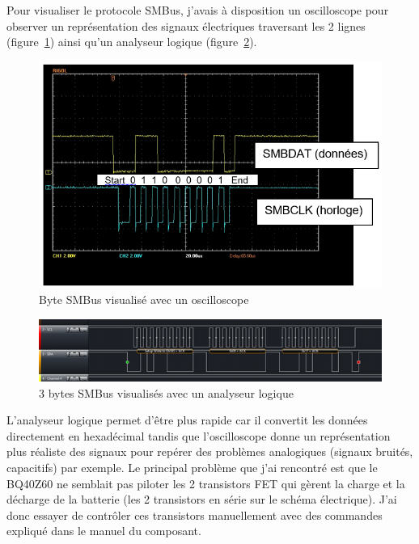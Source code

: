 \documentclass[a4paper, 11pt]{report}
\begin{document}
Pour visualiser le protocole SMBus, j’avais à disposition un oscilloscope pour observer un représentation des signaux électriques traversant les 2 lignes (figure~\ref{fig:SMBus_oscilloscope}) ainsi qu’un analyseur logique (figure~\ref{fig:SMBus_logic_analyser}).

\begin{figure}[!h]
\begin{center}
\includegraphics[scale=0.6]{figures/screenshots/SMBus_oscilloscope.png}
\end{center}
\caption{Byte SMBus visualisé avec un oscilloscope}
\label{fig:SMBus_oscilloscope}
\end{figure}

\begin{figure}[!h]
\begin{center}
\includegraphics[width=\textwidth]{figures/screenshots/SMBus_logic_analyser.png}
\end{center}
\caption{3 bytes SMBus visualisés avec un analyseur logique}
\label{fig:SMBus_logic_analyser}
\end{figure}

L’analyseur logique permet d’être plus rapide car il convertit les données directement en hexadécimal tandis que l’oscilloscope donne un représentation plus réaliste des signaux pour repérer des problèmes analogiques (signaux bruités, capacitifs) par exemple.
Le principal problème que j’ai rencontré est que le BQ40Z60 ne semblait pas piloter les 2 transistors FET qui gèrent la charge et la décharge de la batterie (les 2 transistors en série sur le schéma électrique).
J’ai donc essayer de contrôler ces transistors manuellement avec des commandes expliqué dans le manuel du composant.
\end{document}

